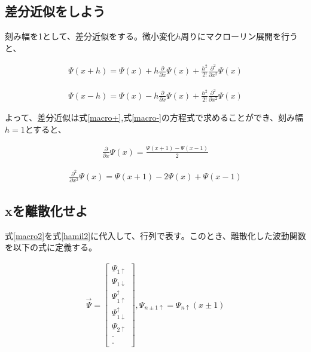 \documentclass{jsarticle}
\begin{document}
		\subsection{差分近似をしよう}
		刻み幅を1として、差分近似をする。微小変化$h$周りにマクローリン展開を行うと、
		
		\begin{align}
			\Psi\left(x+h\right)=\Psi\left(x\right)+h\frac{\partial}{\partial x}\Psi\left(x\right)+\frac{h^2}{2!}\frac{\partial^2}{\partial x^2}\Psi\left(x\right)
			\label{macro+}
		\end{align}
		
		\begin{align}
			\Psi\left(x-h\right)=\Psi\left(x\right)-h\frac{\partial}{\partial x}\Psi\left(x\right)+\frac{h^2}{2!}\frac{\partial^2}{\partial x^2}\Psi\left(x\right)
			\label{macro-}
		\end{align}
		
		よって、差分近似は式\eqref{macro+},式\eqref{macro-}の方程式で求めることができ、刻み幅$h=1$とすると、
		
		\begin{align}
			\frac{\partial}{\partial x}\Psi\left(x\right)=
			\frac{\Psi\left(x+1\right)-\Psi\left(x-1\right)}{2}
		\end{align}
		
		\begin{align}
			\frac{\partial^2}{\partial x^2}\Psi\left(x\right)=
			\Psi\left(x+1\right)-2\Psi\left(x\right)+\Psi\left(x-1\right)
			\label{macro2}
		\end{align}
		
		\subsection{xを離散化せよ}
		式\eqref{macro2}を式\eqref{hamil2}に代入して、行列で表す。このとき、離散化した波動関数を以下の式に定義する。
		
		\begin{align}
			\vec{\Psi}=
			\begin{bmatrix}
				\Psi_{1\uparrow} \\
				\Psi_{1\downarrow} \\
				\Psi_{1\uparrow}^\dagger \\
				\Psi_{1\downarrow}^\dagger \\
				\Psi_{2\uparrow} \\
				\cdot \\
				\cdot
			\end{bmatrix},
			\Psi_{n\pm 1\uparrow}=\Psi_{n\uparrow}\left(x\pm 1\right)
		\end{align}
		
\end{document}
